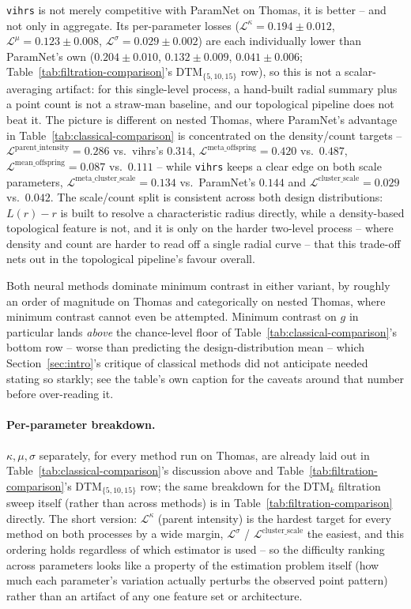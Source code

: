 \documentclass[11pt,letterpaper]{article}
\newcommand{\1}{\mathds{1}}
\theoremstyle{plain}
\theoremstyle{definitioncolon}
\begin{document}
\texttt{vihrs} is not merely competitive with ParamNet on Thomas, it is
better -- and not only in aggregate. Its per-parameter losses
($\mathcal{L}^\kappa=0.194\pm0.012$, $\mathcal{L}^\mu=0.123\pm0.008$,
$\mathcal{L}^\sigma=0.029\pm0.002$) are each individually lower than
ParamNet's own ($0.204\pm0.010$, $0.132\pm0.009$, $0.041\pm0.006$;
Table~\ref{tab:filtration-comparison}'s DTM$_{\{5,10,15\}}$ row), so this is
not a scalar-averaging artifact: for this single-level process, a hand-built
radial summary plus a point count is not a straw-man baseline, and our
topological pipeline does not beat it. The picture is different on nested
Thomas, where ParamNet's advantage in Table~\ref{tab:classical-comparison}
is concentrated on the density/count targets --
$\mathcal{L}^{\text{parent\_intensity}}=0.286$ vs.\ vihrs's $0.314$,
$\mathcal{L}^{\text{meta\_offspring}}=0.420$ vs.\ $0.487$,
$\mathcal{L}^{\text{mean\_offspring}}=0.087$ vs.\ $0.111$ -- while
\texttt{vihrs} keeps a clear edge on both scale parameters,
$\mathcal{L}^{\text{meta\_cluster\_scale}}=0.134$ vs.\ ParamNet's $0.144$ and
$\mathcal{L}^{\text{cluster\_scale}}=0.029$ vs.\ $0.042$. The scale/count
split is consistent across both design distributions: $L(r)-r$ is built to
resolve a characteristic radius directly, while a density-based topological
feature is not, and it is only on the harder two-level process -- where
density and count are harder to read off a single radial curve -- that this
trade-off nets out in the topological pipeline's favour overall.

Both neural methods dominate minimum contrast in either variant, by roughly
an order of magnitude on Thomas and categorically on nested Thomas, where
minimum contrast cannot even be attempted. Minimum contrast on $g$ in
particular lands \emph{above} the chance-level floor of
Table~\ref{tab:classical-comparison}'s bottom row -- worse than predicting
the design-distribution mean -- which Section~\ref{sec:intro}'s critique of
classical methods did not anticipate needed stating so starkly; see the
table's own caption for the caveats around that number before over-reading
it.

\paragraph{Per-parameter breakdown.}
$\kappa,\mu,\sigma$ separately, for every method run on Thomas, are already
laid out in Table~\ref{tab:classical-comparison}'s discussion above and
Table~\ref{tab:filtration-comparison}'s DTM$_{\{5,10,15\}}$ row; the same
breakdown for the DTM$_k$ filtration sweep itself (rather than across
methods) is in Table~\ref{tab:filtration-comparison} directly. The
short version: $\mathcal{L}^\kappa$ (parent intensity) is the hardest target
for every method on both processes by a wide margin, $\mathcal{L}^\sigma$ /
$\mathcal{L}^{\text{cluster\_scale}}$ the easiest, and this ordering holds
regardless of which estimator is used -- so the difficulty ranking across
parameters looks like a property of the estimation problem itself (how much
each parameter's variation actually perturbs the observed point pattern)
rather than an artifact of any one feature set or architecture.
\end{document}
